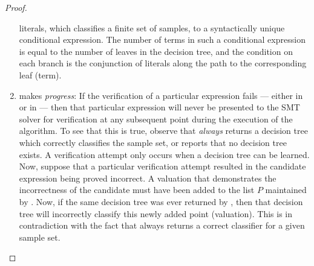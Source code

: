 \begin{proof}
\begin{enumerate}
literals, which classifies a finite set of samples, to a syntactically
unique conditional expression. The number of terms in such a
conditional expression is equal to the number of leaves in the
decision tree, and the condition on each branch is the conjunction of
literals along the path to the corresponding leaf (term).
\item
{} makes \emph{progress}: If the verification of a
particular expression fails --- either in  or in
 --- then that particular expression will never
be presented to the SMT solver for verification at any subsequent
point during the execution of the algorithm. To see that this is true,
observe that  \emph{always} returns a
decision tree which correctly classifies the sample set, or reports
that no decision tree exists. A verification attempt only occurs when
a decision tree can be learned. Now, suppose that a particular
verification attempt resulted in the candidate expression being proved
incorrect. A valuation that demonstrates the incorrectness of the
candidate must have been added to the list $P$ maintained by
. Now, if the same decision tree was ever returned by
, then that decision tree will
incorrectly classify this newly added point (valuation). This is in
contradiction with the fact that 
always returns a correct classifier for a given sample set.
\end{enumerate}


\end{proof}
